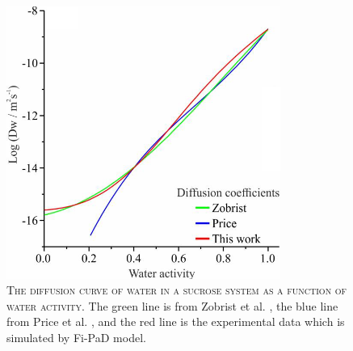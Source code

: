 \begin{figure}
    \centering
    \includegraphics[width=0.8\textwidth]{chapters/water_hopping/figures/image058.png}
    \caption[The diffusion curve of water in a sucrose system as a function of water activity]{\textsc{The diffusion curve of water in a sucrose system as a function of water activity}. The green line is from Zobrist et al. \cite{C0CP01273D}, the blue line from Price et al. \cite{Price2014}, and the red line is the experimental data which is simulated by Fi-PaD model.}
    \label{fig:wat_s11}
\end{figure}

\clearpage

